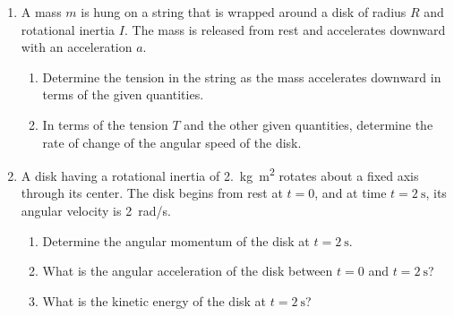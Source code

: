 \documentclass{../../oss-apphys}
\begin{document}
\newpage



\begin{enumerate}[leftmargin=15pt]

\item A mass $m$ is hung on a string that is wrapped around a disk of radius
  $R$ and rotational inertia $I$. The mass is released from rest and
  accelerates downward with an acceleration $a$.
  \begin{enumerate}[noitemsep]
  \item Determine the tension in the string as the mass accelerates downward
    in terms of the given quantities.
  \item In terms of the tension $T$ and the other given quantities, determine
    the rate of change of the angular speed of the disk.
  \end{enumerate}
  \vspace{.5in}
  
\item A disk having a rotational inertia of \SI{2.}{\kilo\gram.\metre^2}
  rotates about a fixed axis through its center. The disk begins from rest at
  $t=0$, and at time $t=\SI{2}{\second}$, its angular velocity is \SI{2}{rad/s}.
  \begin{enumerate}[noitemsep]
  \item Determine the angular momentum of the disk at $t=\SI{2}{\second}$.
  \item What is the angular acceleration of the disk between $t=0$ and
    $t=\SI{2}{\second}$?
  \item What is the kinetic energy of the disk at $t=\SI{2}{\second}$?
  \end{enumerate}
\end{enumerate}
\end{document}
